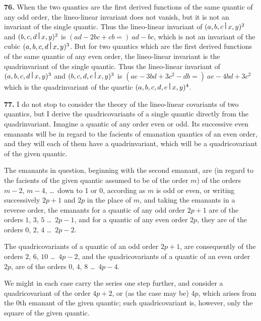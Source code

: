 \documentclass[12pt,a4paper]{article}
\theoremstyle{definition}
\begin{document}
\medskip
\noindent\textbf{76.} When the two quantics are the first derived functions of the same quantic of any odd order, the lineo-linear invariant does not vanish, but it is not an invariant of the single quantic. Thus the lineo-linear invariant of $(a,b,c\,\raisebox{0.5ex}{\textbf{\textbar}}\,x,y)^2$ and $(b,c,d\,\raisebox{0.5ex}{\textbf{\textbar}}\,x,y)^2$ is $(ad-2bc+cb=)\ ad-bc$, which is not an invariant of the cubic $(a,b,c,d\,\raisebox{0.5ex}{\textbf{\textbar}}\,x,y)^3$. But for two quantics which are the first derived functions of the same quantic of any even order, the lineo-linear invariant is the quadrinvariant of the single quantic. Thus the lineo-linear invariant of $(a,b,c,d\,\raisebox{0.5ex}{\textbf{\textbar}}\,x,y)^3$ and $(b,c,d,e\,\raisebox{0.5ex}{\textbf{\textbar}}\,x,y)^3$ is $(ae-3bd+3c^2-db=)\ ae-4bd+3c^2$ which is the quadrinvariant of the quartic $(a,b,c,d,e\,\raisebox{0.5ex}{\textbf{\textbar}}\,x,y)^4$.

\newpage

\medskip
\noindent\textbf{77.} I do not stop to consider the theory of the lineo-linear covariants of two quantics, but I derive the quadricovariants of a single quantic directly from the quadrinvariant. Imagine a quantic of any order even or odd. Its successive even emanants will be in regard to the facients of emanation quantics of an even order, and they will each of them have a quadrinvariant, which will be a quadricovariant of the given quantic.

The emanants in question, beginning with the second emanant, are (in regard to the facients of the given quantic assumed to be of the order $m$) of the orders $m-2$, $m-4$, \ldots\ down to 1 or 0, according as $m$ is odd or even, or writing successively $2p+1$ and $2p$ in the place of $m$, and taking the emanants in a reverse order, the emanants for a quantic of any odd order $2p+1$ are of the orders $1$, $3$, $5$ \ldots\ $2p-1$, and for a quantic of any even order $2p$, they are of the orders $0$, $2$, $4$ \ldots\ $2p-2$.

The quadricovariants of a quantic of an odd order $2p+1$, are consequently of the orders $2$, $6$, $10$ \ldots\ $4p-2$, and the quadricovariants of a quantic of an even order $2p$, are of the orders $0$, $4$, $8$ \ldots\ $4p-4$.

We might in each case carry the series one step further, and consider a quadricovariant of the order $4p+2$, or (as the case may be) $4p$, which arises from the $0$th emanant of the given quantic; such quadricovariant is, however, only the square of the given quantic.
\end{document}
